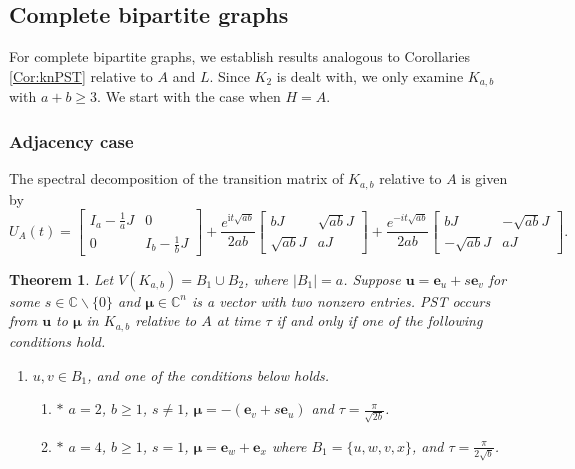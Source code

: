 \documentclass{article}
\numberwithin{equation}{section}
\newtheorem{theorem}[lemma]{Theorem}
\newcommand{\be}{\mathbf e}
\newcommand{\bu}{\mathbf u}
\newcommand{\bmu}{{\boldsymbol{\mu}}}
\def\C{\mathbb{C}}
\def\ii{\mathrm{i}}
\begin{document}
{%

\subsection{Complete bipartite graphs}

For complete bipartite graphs, we establish results analogous to Corollaries \ref{Cor:knPST} relative to $A$ and $L$. Since $K_2$ is dealt with, we only examine $K_{a,b}$ with $a+b\geq 3$. We start with the case when $H=A$. 


\subsubsection{Adjacency case}

The spectral decomposition of the transition matrix of $K_{a,b}$ relative to $A$ is given by
\begin{equation}
\label{Eq:completebip}
U_A(t)=\begin{bmatrix}
I_a-\frac{1}{a}J&0 \\ 0&I_b-\frac{1}{b}J
\end{bmatrix}+\frac{e^{\ii t\sqrt{ab}}}{2ab}\begin{bmatrix}
bJ&\sqrt{ab}J \\ \sqrt{ab}J&aJ
\end{bmatrix}+\frac{e^{-it\sqrt{ab}}}{2ab}\begin{bmatrix}
bJ&-\sqrt{ab}J \\ -\sqrt{ab}J&aJ
\end{bmatrix}.
\end{equation}

\begin{theorem}
\label{Thm:kmnPSTc1}
Let $V(K_{a,b})=B_1\cup B_2$, where $|B_1|=a$. Suppose $\bu=\be_u+s\be_v$ for some $s\in\C\backslash\{0\}$ and $\bmu\in\C^n$ is a vector with two nonzero entries. PST occurs from $\bu$ to $\bmu$ in $K_{a,b}$ relative to $A$ at time $\tau$ if and only if one of the following conditions hold.
\begin{enumerate}
\item $u,v\in B_1$, and one of the conditions below holds.
\begin{enumerate}

\item $*$ $a=2$, $b\geq 1$, $s\neq 1$, $\bmu=-(\be_v+s\be_u)$ and $\tau=\frac{\pi}{\sqrt{2b}}$. 

\item $*$ $a=4$, $b\geq 1$, $s=1$, $\bmu=\be_w+\be_x$ where $B_1=\{u,w,v,x\}$, and $\tau=\frac{\pi}{2\sqrt{b}}$. 


\end{enumerate}
\end{enumerate}
\end{theorem}}
\end{document}

